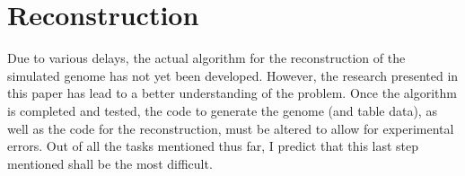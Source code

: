 \section{Reconstruction}

Due to various delays, the actual algorithm for the 
reconstruction of the simulated genome has not yet been developed.
However, the research presented in this paper has lead to a better
understanding of the problem.
Once the algorithm is completed and tested,
the code to generate the genome (and table data), as well as the code for
the reconstruction, must be altered to allow for experimental errors.  Out
of all the tasks mentioned thus far, I predict that this last step
mentioned shall be the most difficult.
